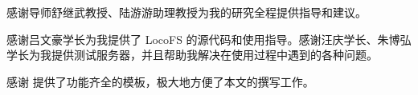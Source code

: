 
\begin{acknowledgements}
  感谢导师舒继武教授、陆游游助理教授为我的研究全程提供指导和建议。

  感谢吕文豪学长为我提供了 LocoFS 的源代码和使用指导。感谢汪庆学长、朱博弘学长为我提供测试服务器，并且帮助我解决在使用过程中遇到的各种问题。

  感谢 \thuthesis\cite{thuthesis} 提供了功能齐全的模板，极大地方便了本文的撰写工作。
\end{acknowledgements}
